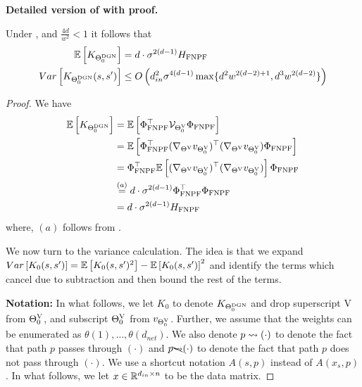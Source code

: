 \begin{appendix}
\textbf{Detailed version of  with proof.}
\begin{theorem}\label{th:mainrefined}
Under , and $\frac{4d}{w^2}<1$ it follows that
 \begin{align*}
\mathbb{E}\left[K_{\Theta^{\text{DGN}}_0}\right]&=d\cdot\sigma^{2(d-1)} H_{\text{FNPF}}\\
Var\left[K_{\Theta^{\text{DGN}}_0}(s,s')\right]&\leq O\left(d^2_{in}\sigma^{4(d-1)}\max\{d^2w^{2(d-2)+1}, d^3w^{2(d-2)}\}\right)
\end{align*}
\end{theorem}

\begin{proof}
We have 
\begin{align*}
\mathbb{E}\left[K_{\Theta^{\text{DGN}}_0}\right]&=\mathbb{E}\left[\Phi^\top_{\text{FNPF}} \mathcal{V}_{{\Theta}^{\text{V}}_0} \Phi_{\text{FNPF}}\right]\\
&=\mathbb{E}\left[\Phi^\top_{\text{FNPF}} (\nabla_{{\Theta}^{\text{V}}}v_{{\Theta}^{\text{V}}_0})^\top (\nabla_{{\Theta}^{\text{V}}}v_{{\Theta}^{\text{V}}_0}) \Phi_{\text{FNPF}}\right]\\
&=\Phi^\top_{\text{FNPF}} \mathbb{E}\left[(\nabla_{{\Theta}^{\text{V}}}v_{{\Theta}^{\text{V}}_0})^\top (\nabla_{{\Theta}^{\text{V}}}v_{{\Theta}^{\text{V}}_0})\right]\Phi_{\text{FNPF}}\\
&\stackrel{(a)}=d\cdot\sigma^{2(d-1)} \Phi^\top_{\text{FNPF}}\Phi_{\text{FNPF}}\\
&=d\cdot\sigma^{2(d-1)} H_{\text{FNPF}}
\end{align*}
where, $(a)$ follows from .

We now turn to the variance calculation. The idea is that we expand  $Var\left[K_0(s,s')\right]=\mathbb{E}\left[K_0(s,s')^2\right] -\mathbb{E}\left[K_0(s,s')\right]^2$ and identify the terms which cancel due to subtraction and then bound the rest of the terms.

\textbf{Notation:} In what follows, we let $K_0$ to denote $K_{\Theta^{\text{DGN}}_0}$ and drop superscript V from ${\Theta}^{\text{V}}_0$, and subscript ${\Theta}^{\text{V}}_0$ from $v_{{\Theta}^{\text{V}}_0}$. Further, we assume that the weights can be enumerated as $\theta(1),\ldots, \theta(d_{net})$. We also denote $p\rightsquigarrow (\cdot)$ to denote the fact that path $p$ passes through $(\cdot)$ and $p\bcancel{\rightsquigarrow}(\cdot)$ to denote the fact that path $p$ does not pass through $(\cdot)$. We use a shortcut notation $A(s,p)$ instead of $A(x_s,p)$. In what follows, we let $x\in\mathbb{R}^{d_{in}\times n}$ to be the data matrix.


\end{proof}
\end{appendix}
